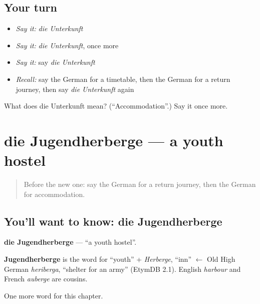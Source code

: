 \subsection*{Your turn}
\begin{itemize}
\raggedright
  \item \emph{Say it:} \emph{die Unterkunft}
  \item \emph{Say it:} \emph{die Unterkunft}, once more
  \item \emph{Say it:} say \emph{die Unterkunft}
  \item \emph{Recall:} say the German for a timetable, then the German for a return journey, then say \emph{die Unterkunft} again
\end{itemize}

\begin{tcolorbox}[breakable,colback=teal!4,colframe=teal!35!black,title={Before you move on}]
What does die Unterkunft mean? (\textquotedblleft{}Accommodation\textquotedblright{}.) Say it once more.
\end{tcolorbox}
\section[die Jugendherberge]{die Jugendherberge — a youth hostel}

\label{lesson:GE-C193-jugendherberge}



\begin{quote}
Before the new one: say the German for a return journey, then the German for accommodation.
\end{quote}

\subsection*{You'll want to know: die Jugendherberge}
\textbf{die Jugendherberge} — \textquotedblleft{}a youth hostel\textquotedblright{}.

\begin{cousinweb}
\textbf{Jugendherberge} is the word for \textquotedblleft{}youth\textquotedblright{} + \emph{Herberge}, \textquotedblleft{}inn\textquotedblright{} $\leftarrow$ Old High German \emph{heriberga}, \textquotedblleft{}shelter for an army\textquotedblright{} (EtymDB 2.1). English \emph{harbour} and French \emph{auberge} are cousins.
\end{cousinweb}

\begin{grammarlens}[title={What you've built}]
One more word for this chapter.
\end{grammarlens}

